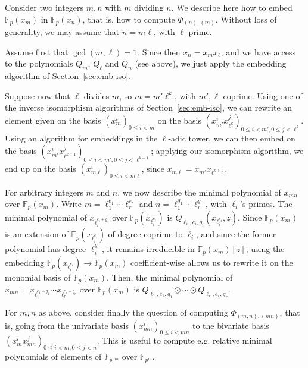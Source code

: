 \documentclass{sig-alternate}
\def\F {\ensuremath{\mathbb{F}}}
\newcounter{algo}
\begin{document}
\smallskip{} Consider two integers $m,n$
with $m$ dividing $n$. We describe here how to embed $\F_p(x_m)$ in
$\F_p(x_n)$, that is, how to compute $\Phi_{(n),(m)}$. Without loss of
generality, we may assume that $n = m\ell$, with $\ell$ prime.

Assume first that $\gcd(m,\ell)=1$. Since then $x_n = x_m x_\ell$, and
we have access to the polynomials $Q_m$, $Q_\ell$ and $Q_n$ (see
above), we just apply the embedding algorithm of
Section~\ref{sec:emb-iso}.

Suppose now that $\ell$ divides $m$, so $m=m'\ell^k$, with $m',\ell$
coprime. Using one of the inverse isomorphism algorithms of
Section~\ref{sec:emb-iso}, we can rewrite an element given on the
basis $(x_m^i)_{0 \le i < m}$ on the basis $(x_{m'}^i x_{\ell^k}^j)_{0
  \le i < m', 0 \le j < \ell^k}$. Using an algorithm for embeddings in
the $\ell$-adic tower, we can then embed on the basis $(x_{m'}^i
x_{\ell^{k+1}}^j)_{0 \le i < m', 0 \le j < \ell^{k+1}}$; applying our
isomorphism algorithm, we end up on the basis $(x_{m\ell}^i)_{0 \le i
  < m \ell}$, since $x_{m \ell} = x_{m'} x_{\ell^{k+1}}$.

\smallskip{}  For
arbitrary integers $m$ and $n$, we now describe the minimal polynomial
of $x_{mn}$ over $\F_p(x_m)$. Write $m=\ell_1^{e_1}\cdots
\ell_r^{e_r}$ and $n=\ell_1^{g_1}\cdots\ell_r^{g_r}$, with $\ell_i$'s
primes. The minimal polynomial of $x_{\ell_i^{e_i+g_i}}$ over
$\F_p(x_{\ell_i^{e_i}})$ is $Q_{\ell_i,e_i,g_i}(x_{\ell_i^{e_i}},z)$.
Since $\F_p(x_m)$ is an extension of $\F_p(x_{\ell_i^{e_i}})$ of
degree coprime to $\ell_i$, and since the former polynomial has degree
$\ell_i^{g_i}$, it remains irreducible in $\F_p(x_m)[z]$; using the
embedding $\F_p(x_{\ell_i^{e_i}}) \to \F_p(x_m)$ coefficient-wise
allows us to rewrite it on the monomial basis of $\F_p(x_m)$. Then,
the minimal polynomial of $x_{mn} = x_{\ell_1^{e_1+g_1}}\cdots
x_{\ell_r^{e_r+g_r}}$ over $\F_p(x_m)$ is $Q_{\ell_1,e_1,g_1} \odot
\cdots \odot Q_{\ell_r,e_r,g_r}$.

\smallskip{} For $m,n$ as above,
consider finally the question of computing $\Phi_{(m,n),(mn)}$, that
is, going from the univariate basis $(x_{mn}^i)_{0 \le i < mn}$ to the
bivariate basis \sloppy $(x_m^i x_{mn}^j)_{0 \le i < m, 0 \le j < n}$. This is
useful to compute e.g.  relative minimal polynomials of elements of
$\F_{p^{mn}}$ over $\F_{p^m}$.
\end{document}
